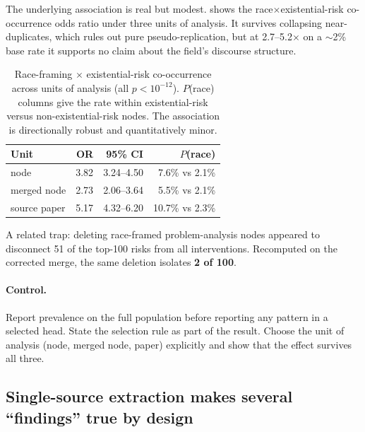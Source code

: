 \documentclass[10pt,twocolumn,letterpaper]{article}
\begin{document}
The underlying association is real but modest.  shows the
race$\times$existential-risk co-occurrence odds ratio under three units of
analysis. It survives collapsing near-duplicates, which rules out pure
pseudo-replication, but at 2.7--5.2$\times$ on a $\sim$2\% base rate it supports
no claim about the field's discourse structure.

\begin{table}[t]
\centering
\small
\begin{tabular}{lrrr}
\toprule
\textbf{Unit} & \textbf{OR} & \textbf{95\% CI} & \textbf{$P$(race)} \\
\midrule
node               & 3.82 & 3.24--4.50 & 7.6\% vs 2.1\% \\
merged node        & 2.73 & 2.06--3.64 & 5.5\% vs 2.1\% \\
source paper       & 5.17 & 4.32--6.20 & 10.7\% vs 2.3\% \\
\bottomrule
\end{tabular}
\caption{Race-framing $\times$ existential-risk co-occurrence across units of
analysis (all $p < 10^{-12}$). $P$(race) columns give the rate within
existential-risk versus non-existential-risk nodes. The association is
directionally robust and quantitatively minor.}
\label{tab:race}
\end{table}

A related trap: deleting race-framed problem-analysis nodes appeared to
disconnect 51 of the top-100 risks from all interventions. Recomputed on the
corrected merge, the same deletion isolates \textbf{2 of 100}.

\paragraph{Control.} Report prevalence on the full population before reporting
any pattern in a selected head. State the selection rule as part of the result.
Choose the unit of analysis (node, merged node, paper) explicitly and show that
the effect survives all three.

\subsection{Single-source extraction makes several ``findings'' true by design}
\end{document}
